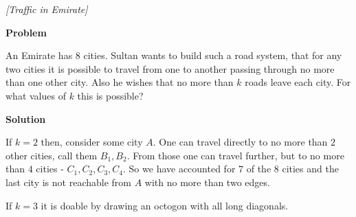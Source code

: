 
%
%




\noindent 

\begin{problem}
\textit{[Traffic in Emirate]}

\textbf{Problem}

An Emirate has 8 cities. Sultan wants to build such a road system, that for any two cities it is possible to travel from one to another passing through no more than one other city. Also he wishes that no more than $k$ roads leave each city. For what values of $k$ this is possible?

\textbf{Solution}

If $k=2$ then, consider some city $A$. One can travel directly to no more than $2$ other cities, call them $B_1, B_2$. From those one can travel further, but to no more than $4$ cities - $C_1,C_2,C_3,C_4$. So we have accounted for $7$ of the $8$ cities and the last city is not reachable from $A$ with no more than two edges.

If $k=3$ it is doable by drawing an octogon with all long diagonals.
\end{problem}
%

